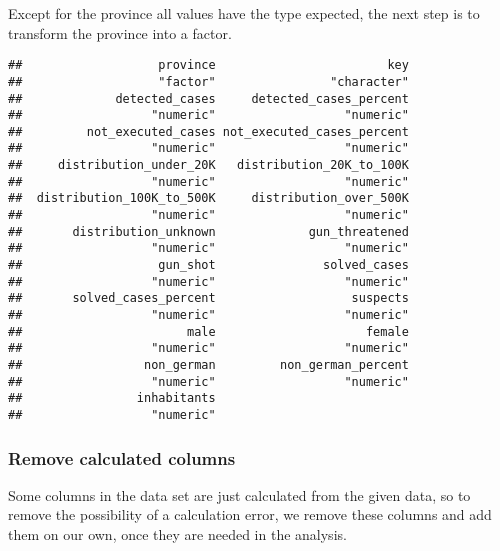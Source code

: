\documentclass[
]{article}
\newenvironment{Shaded}{\begin{snugshade}}{\end{snugshade}}
\newcommand{\KeywordTok}[1]{\textcolor[rgb]{0.13,0.29,0.53}{\textbf{#1}}}
\newcommand{\NormalTok}[1]{#1}
\newcommand{\OperatorTok}[1]{\textcolor[rgb]{0.81,0.36,0.00}{\textbf{#1}}}
\newcommand{\StringTok}[1]{\textcolor[rgb]{0.31,0.60,0.02}{#1}}
\begin{document}
Except for the province all values have the type expected, the next step
is to transform the province into a factor.

\begin{Shaded}
\end{Shaded}

\begin{verbatim}
##                   province                        key 
##                   "factor"                "character" 
##             detected_cases     detected_cases_percent 
##                  "numeric"                  "numeric" 
##         not_executed_cases not_executed_cases_percent 
##                  "numeric"                  "numeric" 
##     distribution_under_20K   distribution_20K_to_100K 
##                  "numeric"                  "numeric" 
##  distribution_100K_to_500K     distribution_over_500K 
##                  "numeric"                  "numeric" 
##       distribution_unknown             gun_threatened 
##                  "numeric"                  "numeric" 
##                   gun_shot               solved_cases 
##                  "numeric"                  "numeric" 
##       solved_cases_percent                   suspects 
##                  "numeric"                  "numeric" 
##                       male                     female 
##                  "numeric"                  "numeric" 
##                 non_german         non_german_percent 
##                  "numeric"                  "numeric" 
##                inhabitants 
##                  "numeric"
\end{verbatim}

\hypertarget{remove-calculated-columns}{%
\subsubsection{Remove calculated
columns}\label{remove-calculated-columns}}

Some columns in the data set are just calculated from the given data, so
to remove the possibility of a calculation error, we remove these
columns and add them on our own, once they are needed in the analysis.

\begin{Shaded}
\end{Shaded}
\end{document}
